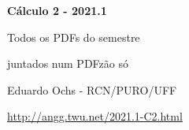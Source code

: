 \documentclass[oneside,12pt]{article}
\begin{document}

\def\drafturl{http://angg.twu.net/LATEX/2021-1-C2.pdf}
\def\drafturl{http://angg.twu.net/2021.1-C2.html}
\def\draftfooter{\tiny \href{\drafturl}{\jobname{}} \ColorBrown{\shorttoday{} \hours}}



%

\thispagestyle{empty}

\begin{center}

\vspace*{1.2cm}

{\bf \Large Cálculo 2 - 2021.1}

\bsk

Todos os PDFs do semestre

juntados num PDFzão só

\bsk

Eduardo Ochs - RCN/PURO/UFF

\url{http://angg.twu.net/2021.1-C2.html}

\end{center}

\newpage

\def\incl#1{}

\incl{2021-1-C2-intro}

\incl{2021-1-C2-subst}

\incl{2021-1-C2-somas-1}

\incl{2021-1-C2-somas-1-dicas}

\incl{2021-1-C2-somas-2}

\incl{2021-1-C2-somas-2-4}

\incl{2021-1-C2-propriedades-da-integral}

\incl{2021-1-C2-MT1}
\end{document}
